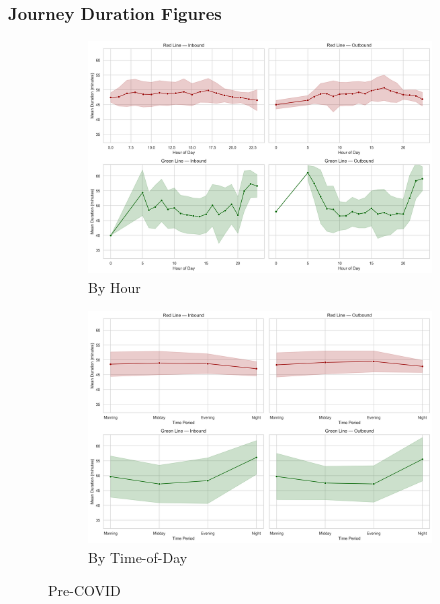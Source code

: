\subsubsection*{Journey Duration Figures}

\begin{figure}[H]
  \centering
  \begin{subfigure}[t]{0.49\textwidth}
    \centering
    \includegraphics[width=\textwidth]{figures/appendix_figures/journey_duration/duration_hourly_combined_precovid.png}
    \caption*{By Hour}
  \end{subfigure}
  \hfill
  \begin{subfigure}[t]{0.49\textwidth}
    \centering
    \includegraphics[width=\textwidth]{figures/appendix_figures/journey_duration/duration_period_combined_precovid.png}
    \caption*{By Time-of-Day}
  \end{subfigure}
  \caption{Pre-COVID}
\end{figure}

